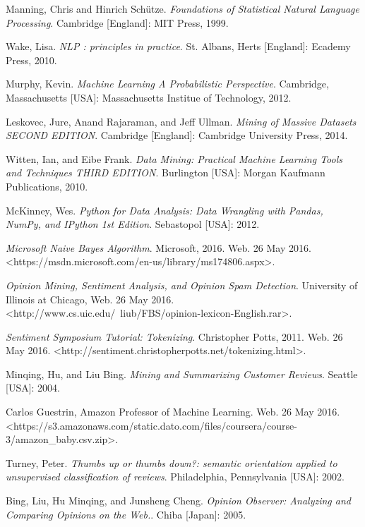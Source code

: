 \documentclass[12pt]{report}
\begin{document}
\begin{thebibliography}{9}

 Manning, Chris and Hinrich Sch{\"u}tze. \textit{Foundations of Statistical Natural Language Processing}. Cambridge [England]: MIT Press, 1999.

 Wake, Lisa. \textit{NLP : principles in practice}. St. Albans, Herts [England]: Ecademy Press, 2010.

 Murphy, Kevin. \textit{Machine Learning A Probabilistic Perspective}. Cambridge, Massachusetts [USA]: Massachusetts Institue of Technology, 2012.

 Leskovec, Jure, Anand Rajaraman, and Jeff Ullman. \textit{Mining of Massive Datasets SECOND EDITION}. Cambridge [England]: Cambridge University Press, 2014.

 Witten, Ian, and Eibe Frank. \textit{Data Mining: Practical Machine Learning Tools and Techniques THIRD EDITION}. Burlington [USA]: Morgan Kaufmann Publications, 2010.

 McKinney, Wes. \textit{Python for Data Analysis: Data Wrangling with Pandas, NumPy, and IPython 1st Edition}. Sebastopol [USA]: 2012.

 \textit{Microsoft Naive Bayes Algorithm}. Microsoft, 2016. Web. 26 May 2016. <https://msdn.microsoft.com/en-us/library/ms174806.aspx>.

 \textit{Opinion Mining, Sentiment Analysis, and Opinion Spam Detection}. University of Illinois at Chicago, Web. 26 May 2016. <http://www.cs.uic.edu/~liub/FBS/opinion-lexicon-English.rar>.

 \textit{Sentiment Symposium Tutorial: Tokenizing}. Christopher Potts, 2011. Web. 26 May 2016. <http://sentiment.christopherpotts.net/tokenizing.html>.

 Minqing, Hu, and Liu Bing. \textit{Mining and Summarizing Customer Reviews}. Seattle [USA]: 2004.

 Carlos Guestrin, Amazon Professor of Machine Learning. Web. 26 May 2016. <https://s3.amazonaws.com/static.dato.com/files/coursera/course-3/amazon\_baby.csv.zip>.

 Turney, Peter. \textit{Thumbs up or thumbs down?: semantic orientation applied to unsupervised classification of reviews}. Philadelphia, Pennsylvania [USA]: 2002.

 Bing, Liu, Hu Minqing, and Junsheng Cheng. \textit{Opinion Observer: Analyzing and Comparing Opinions on the Web.}. Chiba [Japan]: 2005.

\end{thebibliography}
\end{document}

